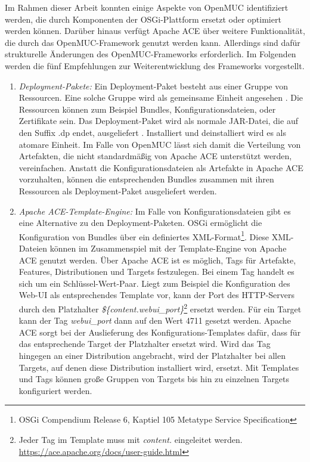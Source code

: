 Im Rahmen dieser Arbeit konnten einige Aspekte von OpenMUC identifiziert werden,
die durch Komponenten der \ac{OSGi}-Plattform ersetzt oder optimiert werden können.
Darüber hinaus verfügt Apache ACE über weitere Funktionalität, die durch das OpenMUC-Framework genutzt werden kann.
Allerdings sind dafür strukturelle Änderungen des OpenMUC-Frameworks erforderlich.
Im Folgenden werden die fünf Empfehlungen zur Weiterentwicklung des Frameworks vorgestellt.

\begin{enumerate}
 \item \textit{Deployment-Pakete:}
 Ein Deployment-Paket besteht aus einer Gruppe von Ressourcen. Eine solche Gruppe wird als gemeinsame Einheit angesehen \cite[S.391]{osgi_r6_compendium}.
 Die Ressourcen können  zum Beispiel Bundles, Konfigurationsdateien, oder Zertifikate sein.
 Das Deployment-Paket wird als normale \ac{JAR}-Datei, die auf den Suffix .dp endet, ausgeliefert \cite[S.393]{osgi_r6_compendium}.
 Installiert und deinstalliert wird es als atomare Einheit. 
 Im Falle von OpenMUC lässt sich damit die Verteilung von Artefakten, die nicht standardmäßig von Apache ACE unterstützt werden, vereinfachen.
 Anstatt die Konfigurationsdateien als Artefakte in Apache ACE vorzuhalten, können die entsprechenden Bundles zusammen mit ihren Ressourcen
 als Deployment-Paket ausgeliefert werden.
 
 \item \textit{Apache ACE-Template-Engine:}
 Im Falle von Konfigurationsdateien gibt es eine Alternative zu den Deployment-Paketen.
 \ac{OSGi} ermöglicht die Konfiguration von Bundles über ein definiertes XML-Format\footnote{OSGi Compendium Release 6, Kaptiel 105 Metatype Service Specification}. 
 Diese XML-Dateien können im Zusammenspiel mit der Template-Engine von Apache ACE genutzt werden.
 Über Apache ACE ist es möglich, Tags für Artefakte, Features, Distributionen und Targets festzulegen. Bei einem Tag handelt es sich um ein Schlüssel-Wert-Paar.
 Liegt zum Beispiel die Konfiguration des Web-UI als entsprechendes Template vor, kann der Port des \ac{HTTP}-Servers
 durch den Platzhalter \textit{\$\{content.webui\_port\}}\footnote{Jeder Tag im Template muss mit \textit{content.} eingeleitet werden. \url{https://ace.apache.org/docs/user-guide.html}} ersetzt werden.
 Für ein Target kann der Tag \textit{webui\_port} dann auf den Wert 4711 gesetzt werden. 
 Apache ACE sorgt bei der Auslieferung des Konfigurations-Templates dafür, dass für das entsprechende Target der Platzhalter ersetzt wird. 
 Wird das Tag hingegen an einer Distribution angebracht, wird der Platzhalter bei allen Targets, auf denen diese Distribution installiert wird, ersetzt.
 Mit Templates und Tags können große Gruppen von Targets bis hin zu einzelnen Targets konfiguriert werden.
  

\end{enumerate}
